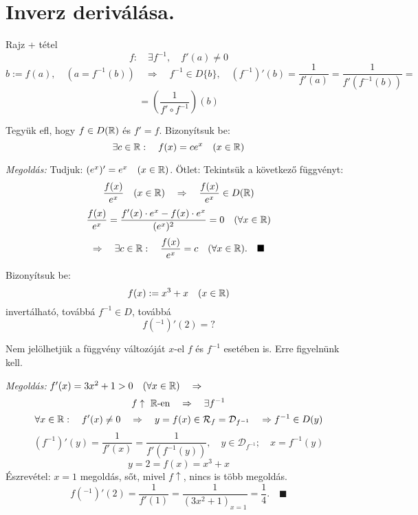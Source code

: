 \documentclass[a4paper,11.5pt]{article}
\begin{document}
	\section{Inverz deriválása.}
	\begin{revision}
		Rajz + tétel
		\[ f:\quad \exists f^{-1},\quad f'(a)\not=0 \]
		\[ b:=f(a),\quad (a=f^{-1}(b))\quad \Rightarrow\quad f^{-1}\in D\{b\},\quad (f^{-1})'(b)=\frac{1}{f'(a)}=\frac{1}{f'(f^{-1}(b))}= \]
		\[ =\left(\frac{1}{f'\circ f^{-1}}\right)(b) \]
		\begin{center}
		\end{center}
	\end{revision}
	\begin{task}
		Tegyük efl, hogy $f\in D(\mathbb{R})$ és $f'=f$. Bizonyítsuk be:
		\[ \exists c\in\mathbb{R}:\quad f(x)=ce^x\quad (x\in\mathbb{R}) \]
		
		\textit{Megoldás:} Tudjuk: $(e^x)'=e^x\quad (x\in\mathbb{R})$. Ötlet: Tekintsük a következő függvényt:
		\[ \frac{f(x)}{e^x}\quad (x\in\mathbb{R})\quad \Rightarrow\quad \frac{f(x)}{e^x}\in D(\mathbb{R}) \]
		\[ \frac{f(x)}{e^x}=\frac{f'(x)\cdot e^x-f(x)\cdot e^x}{(e^x)^2}=0\quad (\forall x\in\mathbb{R}) \]
		\[ \Rightarrow\quad \exists c\in\mathbb{R}:\quad \frac{f(x)}{e^x}=c\quad (\forall x\in\mathbb{R}).\quad \blacksquare \]
	\end{task}
	\begin{task}
		Bizonyítsuk be: \[f(x):=x^3+x\quad (x\in\mathbb{R})\] invertálható, továbbá $f^{-1}\in D$, továbbá \[ f(^{-1})'(2)=? \]
		\begin{note}
			Nem jelölhetjük a függvény változóját $x$-el $f$ és $f^{-1}$ esetében is. Erre figyelnünk kell.
		\end{note}
		\textit{Megoldás:} $f'(x)=3x^2+1>0\quad (\forall x\in \mathbb{R})\quad \Rightarrow$
		\[ f \uparrow \ \mathbb{R}\text{-en}\quad \Rightarrow \quad \exists f^{-1} \]
		\[ \forall x\in\mathbb{R}:\quad f'(x)\not=0\quad \Rightarrow\quad y=f(x)\in\mathcal{R}_f=\mathcal{D}_{f^{-1}}\quad \Rightarrow f^{-1}\in D(y) \]
		\[ (f^{-1})'(y)=\frac{1}{f'(x)}=\frac{1}{f'(f^{-1}(y))},\quad y\in\mathcal{D}_{f^{-1}};\quad x=f^{-1}(y) \]
		\[ y=2=f(x)=x^3+x \]
		Észrevétel: $x=1$ megoldás, sőt, mivel $f\uparrow$, nincs is több megoldás.
		\[ f(^{-1})'(2)=\frac{1}{f'(1)}=\frac{1}{(3x^2+1)_{x=1}}=\frac{1}{4}.\quad \blacksquare \]
	\end{task}
\end{document}
